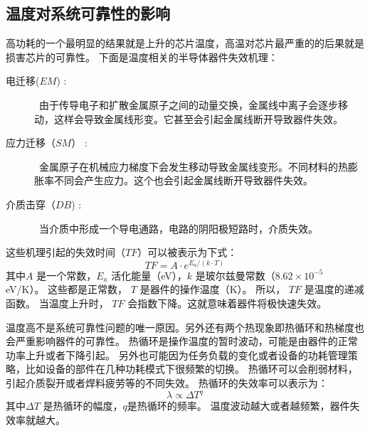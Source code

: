 \subsection{温度对系统可靠性的影响}\label{sec:reliability}
高功耗的一个最明显的结果就是上升的芯片温度，高温对芯片最严重的的后果就是损害芯片的可靠性。
下面是温度相关的半导体器件失效机理\cite{jedec2003failure}：
\begin{description}
\item[电迁移($EM$) :] ~由于传导电子和扩散金属原子之间的动量交换，金属线中离子会逐步移动，这样会导致金属线形变。它甚至会引起金属线断开导致器件失效。
\item[应力迁移（$SM$） :] ~金属原子在机械应力梯度下会发生移动导致金属线变形。不同材料的热膨胀率不同会产生应力。这个也会引起金属线断开导致器件失效。
\item[介质击穿（$DB$) :] ~当介质中形成一个导电通路，电路的阴阳极短路时，介质失效。
\end{description}

这些机理引起的失效时间（$TF$）可以被表示为下式：
\begin{equation}
TF = A \cdot e^{E_a/(k \cdot T)}
\end{equation}
其中$A$ 是一个常数，$E_a$ 活化能量（eV），$k$ 是玻尔兹曼常数（$8.62 \times 10^{-5}$ eV/K）。
这些都是正常数， $T$ 是器件的操作温度（K）。
所以， $TF$ 是温度的递减函数。
当温度上升时， $TF$ 会指数下降。这就意味着器件将极快速失效。

温度高不是系统可靠性问题的唯一原因。另外还有两个热现象即热循环和热梯度也会严重影响器件的可靠性。
热循环是操作温度的暂时波动，可能是由器件的正常功率上升或者下降引起。
另外也可能因为任务负载的变化或者设备的功耗管理策略，比如设备的部件在几种功耗模式下很频繁的切换。
热循环可以会削弱材料，引起介质裂开或者焊料疲劳等的不同失效。
热循环的失效率可以表示为：
\begin{equation}
\lambda \propto \Delta T^q
\end{equation}
其中$\Delta T$ 是热循环的幅度，$q$是热循环的频率。
温度波动越大或者越频繁，器件失效率就越大。

